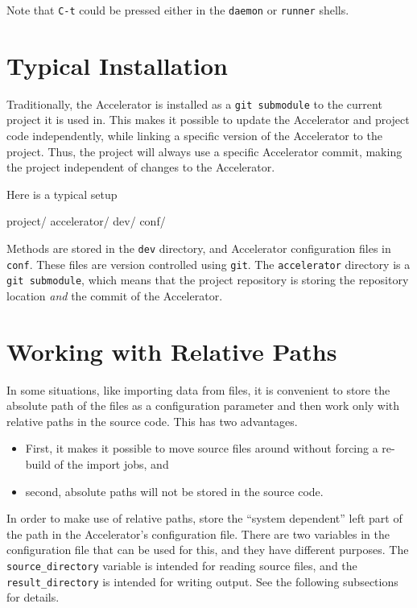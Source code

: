 Note that \texttt{C-t} could be pressed either in the \texttt{daemon}
or \texttt{runner} shells.



\section{Typical Installation}
Traditionally, the Accelerator is installed as a \texttt{git
submodule} to the current project it is used in.  This makes it
possible to update the Accelerator and project code independently,
while linking a specific version of the Accelerator to the project.
Thus, the project will always use a specific Accelerator commit,
making the project independent of changes to the Accelerator.

Here is a typical setup
\begin{shell}
project/
    accelerator/
    dev/
    conf/
\end{shell}
Methods are stored in the \texttt{dev} directory, and Accelerator
configuration files in \texttt{conf}.  These files are version
controlled using \texttt{git}.  The \texttt{accelerator} directory is
a \texttt{git submodule}, which means that the project repository is
storing the repository location \textsl{and} the commit of the
Accelerator.




\section{Working with Relative Paths}

In some situations, like importing data from files, it is convenient
to store the absolute path of the files as a configuration parameter
and then work only with relative paths in the source code.  This has
two advantages.
\begin{itemize}
\item[] First, it makes it possible to move source files around without
forcing a re-build of the import jobs, and
\item[] second, absolute paths will not be stored in the source code.
\end{itemize}
In order to make use of relative paths, store the ``system dependent''
left part of the path in the Accelerator's configuration file.  There
are two variables in the configuration file that can be used for this,
and they have different purposes.  The \texttt{source\_directory}
variable is intended for reading source files, and
the \texttt{result\_directory} is intended for writing output.  See
the following subsections for details.


